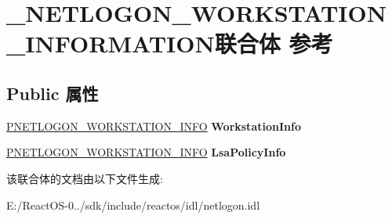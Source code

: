 \hypertarget{union___n_e_t_l_o_g_o_n___w_o_r_k_s_t_a_t_i_o_n___i_n_f_o_r_m_a_t_i_o_n}{}\section{\+\_\+\+N\+E\+T\+L\+O\+G\+O\+N\+\_\+\+W\+O\+R\+K\+S\+T\+A\+T\+I\+O\+N\+\_\+\+I\+N\+F\+O\+R\+M\+A\+T\+I\+O\+N联合体 参考}
\label{union___n_e_t_l_o_g_o_n___w_o_r_k_s_t_a_t_i_o_n___i_n_f_o_r_m_a_t_i_o_n}
\subsection*{Public 属性}
\begin{DoxyCompactItemize}
\item 
\mbox{\label{union___n_e_t_l_o_g_o_n___w_o_r_k_s_t_a_t_i_o_n___i_n_f_o_r_m_a_t_i_o_n_a41e539927331d2ec2cec365332aee163}} 
\hyperlink{struct___n_e_t_l_o_g_o_n___w_o_r_k_s_t_a_t_i_o_n___i_n_f_o}{P\+N\+E\+T\+L\+O\+G\+O\+N\+\_\+\+W\+O\+R\+K\+S\+T\+A\+T\+I\+O\+N\+\_\+\+I\+N\+FO} {\bfseries Workstation\+Info}
\item 
\mbox{\label{union___n_e_t_l_o_g_o_n___w_o_r_k_s_t_a_t_i_o_n___i_n_f_o_r_m_a_t_i_o_n_a9bc1ddf9a24f4da16c7ef83ffd52632e}} 
\hyperlink{struct___n_e_t_l_o_g_o_n___w_o_r_k_s_t_a_t_i_o_n___i_n_f_o}{P\+N\+E\+T\+L\+O\+G\+O\+N\+\_\+\+W\+O\+R\+K\+S\+T\+A\+T\+I\+O\+N\+\_\+\+I\+N\+FO} {\bfseries Lsa\+Policy\+Info}
\end{DoxyCompactItemize}


该联合体的文档由以下文件生成\+:\begin{DoxyCompactItemize}
\item 
E\+:/\+React\+O\+S-\/0../sdk/include/reactos/idl/netlogon.\+idl\end{DoxyCompactItemize}
